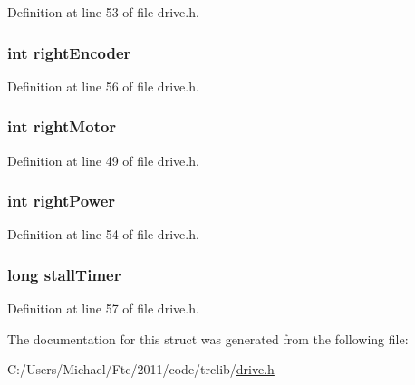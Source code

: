 Definition at line 53 of file drive.h.

\hypertarget{struct_d_r_i_v_e_a529a20307b64e9793dbe0630b0381ba0}{
\subsubsection[{rightEncoder}]{\setlength{\rightskip}{0pt plus 5cm}int {\bf rightEncoder}}}
\label{struct_d_r_i_v_e_a529a20307b64e9793dbe0630b0381ba0}


Definition at line 56 of file drive.h.

\hypertarget{struct_d_r_i_v_e_a8235d58dd2708fea5e5f54475362bf77}{
\subsubsection[{rightMotor}]{\setlength{\rightskip}{0pt plus 5cm}int {\bf rightMotor}}}
\label{struct_d_r_i_v_e_a8235d58dd2708fea5e5f54475362bf77}


Definition at line 49 of file drive.h.

\hypertarget{struct_d_r_i_v_e_a957fe120aeb90451719fa94ad0cb552d}{
\subsubsection[{rightPower}]{\setlength{\rightskip}{0pt plus 5cm}int {\bf rightPower}}}
\label{struct_d_r_i_v_e_a957fe120aeb90451719fa94ad0cb552d}


Definition at line 54 of file drive.h.

\hypertarget{struct_d_r_i_v_e_a753e55872364cf5e6ab6968b26e23ca7}{
\subsubsection[{stallTimer}]{\setlength{\rightskip}{0pt plus 5cm}long {\bf stallTimer}}}
\label{struct_d_r_i_v_e_a753e55872364cf5e6ab6968b26e23ca7}


Definition at line 57 of file drive.h.



The documentation for this struct was generated from the following file:\begin{DoxyCompactItemize}
\item 
C:/Users/Michael/Ftc/2011/code/trclib/\hyperlink{drive_8h}{drive.h}\end{DoxyCompactItemize}
